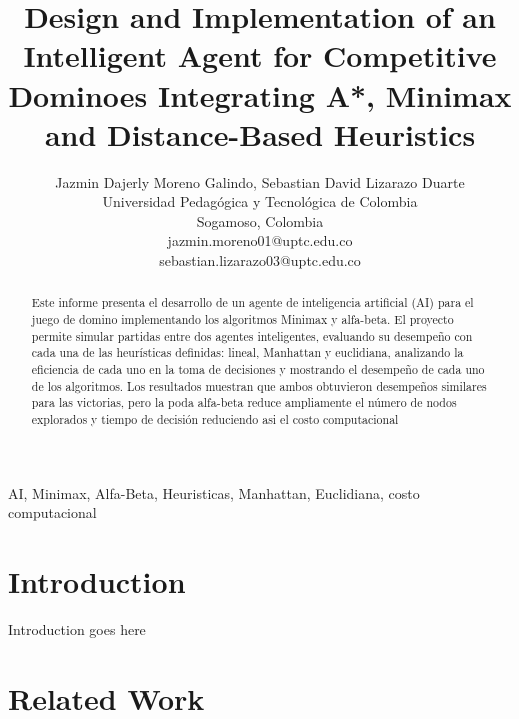 \documentclass[journal,onecolumn]{IEEEtran}
\begin{document}
\title{Design and Implementation of an Intelligent Agent for Competitive Dominoes Integrating A*, Minimax and Distance-Based Heuristics}


\author{Jazmin Dajerly Moreno Galindo, Sebastian David Lizarazo Duarte\\ 
Universidad Pedagógica y Tecnológica de Colombia \\ 
Sogamoso, Colombia \\ 
jazmin.moreno01@uptc.edu.co\\
sebastian.lizarazo03@uptc.edu.co}


\maketitle

\begin{abstract}
Este informe presenta el desarrollo de un agente de inteligencia artificial (AI) para el juego de domino implementando los algoritmos Minimax y alfa-beta. El proyecto permite simular partidas entre dos agentes inteligentes, evaluando su desempeño con cada una de las heurísticas definidas: lineal, Manhattan y euclidiana, analizando la eficiencia de cada uno en la toma de decisiones y mostrando el desempeño de cada uno de los algoritmos. Los resultados muestran que ambos obtuvieron desempeños similares para las victorias, pero la poda alfa-beta reduce ampliamente el número de nodos explorados y tiempo de decisión reduciendo asi el costo computacional 
\end{abstract}

\begin{IEEEkeywords}
AI, Minimax, Alfa-Beta, Heuristicas, Manhattan, Euclidiana, costo computacional
\end{IEEEkeywords}

\IEEEpeerreviewmaketitle



\section{Introduction}
Introduction goes here

\section{Related Work}
\end{document}
